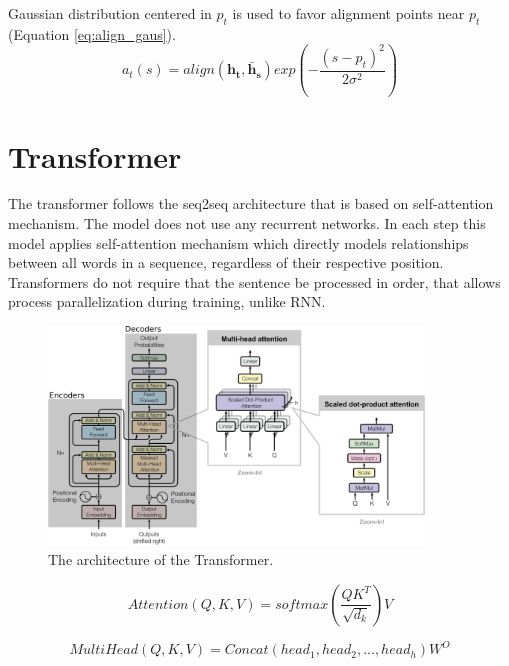 Gaussian distribution centered in $p_t$ is used to favor alignment points near $p_t$ (Equation \ref{eq:align_gaus}).
\begin{equation} \label{eq:align_gaus}
a_t(s) = align(\mathbf{h_t}, \mathbf{\bar{h}_s}) exp(-\frac{(s-p_t)^2}{2\sigma^2})
\end{equation}

\section{Transformer} \label{sec_transformer}

The transformer \cite{vaswani2017attention} follows the seq2seq architecture that is based on self-attention mechanism. The model does not use any recurrent networks. In each step this model applies self-attention mechanism which directly models relationships between all words in a sequence, regardless of their respective position. Transformers do not require that the sentence be processed in order, that allows process parallelization during training, unlike RNN. 

\begin{figure}
  \centering
  \includegraphics[width=0.9\textwidth]{figures/transformer_attention.pdf}
  \caption[Transformer architecture]{The architecture of the Transformer.\protect\footnotemark}
  \label{fig:transformer}
\end{figure}


\begin{equation} \label{eq:transformer_attention}
Attention(Q, K, V) = softmax(\frac{QK^T}{\sqrt{d_k}})V
\end{equation}

\begin{equation} \label{eq:transformer_multi_head}
MultiHead(Q, K, V) = Concat(head_1, head_2, ..., head_h)W^O
\end{equation}

